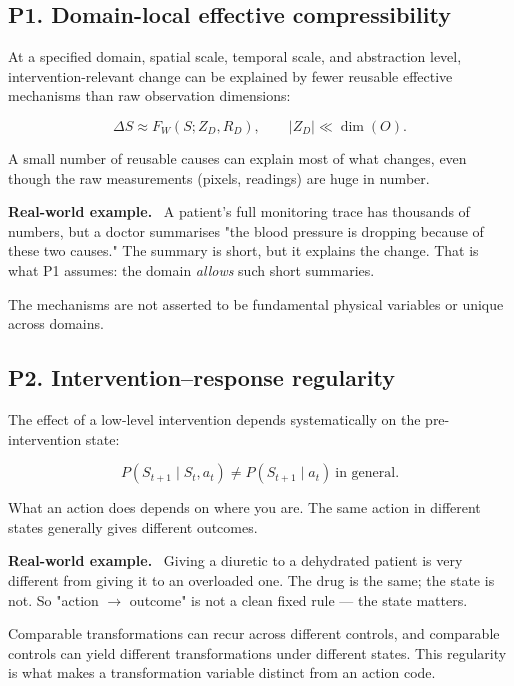 \documentclass[11pt]{article}
\newenvironment{plainword}{%
  \par\medskip\noindent\begin{minipage}{\textwidth}%
  \color{gray!75!black}\small\itshape
}{%
  \end{minipage}\par\medskip}
\newenvironment{example}{%
  \par\smallskip\noindent\begin{minipage}{\textwidth}%
  \color{teal!60!black}\small
  \textbf{\color{teal!70!black}Real-world example.}\
}{%
  \end{minipage}\par\smallskip}
\begin{document}
\subsection*{P1. Domain-local effective compressibility}

At a specified domain, spatial scale, temporal scale, and abstraction level, intervention-relevant change can be explained by fewer
reusable effective mechanisms than raw observation dimensions:

\[
\boxed{\Delta S\approx F_W(S;Z_D,R_D),\qquad |Z_D|\ll \dim(O).}
\]

\begin{plainword}
A small number of reusable causes can explain most of what changes, even though the raw measurements (pixels, readings) are huge in
number.
\end{plainword}

\begin{example}
A patient's full monitoring trace has thousands of numbers, but a doctor summarises "the blood pressure is dropping because of
these two causes." The summary is short, but it explains the change. That is what P1 assumes: the domain \emph{allows} such short
summaries.
\end{example}

The mechanisms are not asserted to be fundamental physical variables or unique across domains.

\subsection*{P2. Intervention--response regularity}

The effect of a low-level intervention depends systematically on the pre-intervention state:

\[
\boxed{P(S_{t+1}\mid S_t,a_t)\neq P(S_{t+1}\mid a_t)\ \text{in general}.}
\]

\begin{plainword}
What an action does depends on where you are. The same action in different states generally gives different outcomes.
\end{plainword}

\begin{example}
Giving a diuretic to a dehydrated patient is very different from giving it to an overloaded one. The drug is the same; the state is
not. So "action $\to$ outcome" is not a clean fixed rule --- the state matters.
\end{example}

Comparable transformations can recur across different controls, and comparable controls can yield different transformations under
different states. This regularity is what makes a transformation variable distinct from an action code.
\end{document}
